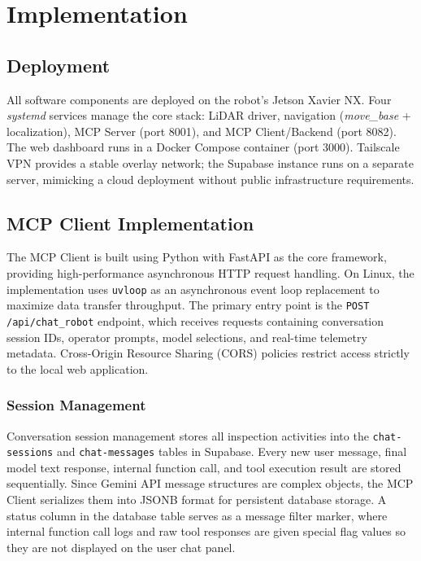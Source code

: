 \documentclass[conference]{IEEEtran}
\begin{document}
\section{Implementation}

\subsection{Deployment}
All software components are deployed on the robot's Jetson Xavier NX. Four \textit{systemd} services manage the core stack: LiDAR driver, navigation (\textit{move\_base} + localization), MCP Server (port 8001), and MCP Client/Backend (port 8082). The web dashboard runs in a Docker Compose container (port 3000). Tailscale VPN provides a stable overlay network; the Supabase instance runs on a separate server, mimicking a cloud deployment without public infrastructure requirements.

\subsection{MCP Client Implementation}
The MCP Client is built using Python with FastAPI as the core framework, providing high-performance asynchronous HTTP request handling. On Linux, the implementation uses \texttt{uvloop} as an asynchronous event loop replacement to maximize data transfer throughput. The primary entry point is the \texttt{POST /api/chat\_robot} endpoint, which receives requests containing conversation session IDs, operator prompts, model selections, and real-time telemetry metadata. Cross-Origin Resource Sharing (CORS) policies restrict access strictly to the local web application.

\subsubsection{Session Management}
Conversation session management stores all inspection activities into the \texttt{chat-sessions} and \texttt{chat-messages} tables in Supabase. Every new user message, final model text response, internal function call, and tool execution result are stored sequentially. Since Gemini API message structures are complex objects, the MCP Client serializes them into JSONB format for persistent database storage. A status column in the database table serves as a message filter marker, where internal function call logs and raw tool responses are given special flag values so they are not displayed on the user chat panel.
\end{document}
